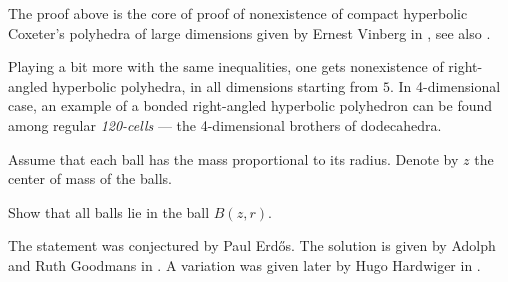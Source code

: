 The proof above 
is the core of proof of nonexistence of compact hyperbolic Coxeter's polyhedra of large dimensions 
given by Ernest Vinberg in \cite{vinberg}, 
see also \cite{vinberg-strong}.

Playing a bit more with the same inequalities, 
one gets nonexistence of  right-angled hyperbolic polyhedra,
in all dimensions starting from $5$.
In 4-dimensional case, an example of a bonded right-angled hyperbolic polyhedron
can be found among regular \emph{120-cells} --- the 4-dimensional brothers of dodecahedra.


Assume that each ball has the mass proportional to its radius.
Denote by $z$  the center of mass of the balls.

Show that all balls lie in the ball $B(z,r)$.
\qeds

The statement was conjectured by Paul Erd\H{o}s.
The solution is given by Adolph and Ruth Goodmans in
\cite{goodman-goodman}.
A variation was given later by Hugo Hardwiger in \cite{hadwiger}.


